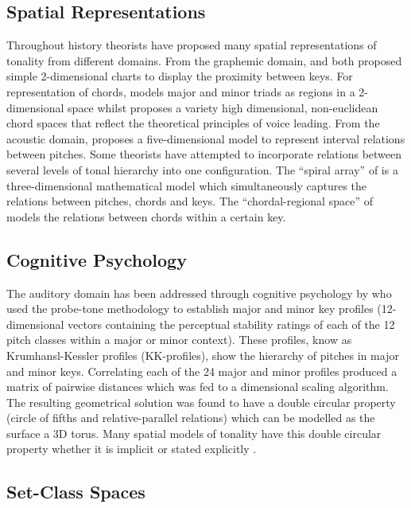 \documentclass{article}
\begin{document}
\subsection{Spatial Representations}
\label{sec-5-2}

Throughout history theorists have proposed many spatial
representations of tonality from different domains. From the graphemic
domain, \citet{Weber} and \citet{Schoenberg} both proposed simple
2-dimensional charts to display the proximity between keys. For
representation of chords, \citet{Riemann} models major and minor
triads as regions in a 2-dimensional space whilst \citet{Tymoczko2011}
proposes a variety high dimensional, non-euclidean chord spaces that
reflect the theoretical principles of voice leading. From the acoustic
domain, \citet{Shepard1982} proposes a five-dimensional model to
represent interval relations between pitches. Some theorists have
attempted to incorporate relations between several levels of tonal
hierarchy into one configuration. The ``spiral array'' of
\citet{Chew2000a} is a three-dimensional mathematical model which
simultaneously captures the relations between pitches, chords and
keys. The ``chordal-regional space'' of \citet{Lerdahl2001a} models the
relations between chords within a certain key.
\subsection{Cognitive Psychology}
\label{sec-5-3}

The auditory domain has been addressed through cognitive psychology by
\citet{Krumhansl1990} who used the probe-tone methodology
\citep{Krumhansl1979} to establish major and minor key profiles
(12-dimensional vectors containing the perceptual stability ratings of
each of the 12 pitch classes within a major or minor context). These
profiles, know as Krumhansl-Kessler profiles (KK-profiles), show the
hierarchy of pitches in major and minor keys. Correlating each of the
24 major and minor profiles produced a matrix of pairwise distances
which was fed to a dimensional scaling algorithm. The resulting
geometrical solution was found to have a double circular property
(circle of fifths and relative-parallel relations) which can be
modelled as the surface a 3D torus. Many spatial models of tonality
have this double circular property whether it is implicit
\citep{Weber,Schoenberg} or stated explicitly \citep{Lerdahl2001a}.
\subsection{Set-Class Spaces}
\label{sec-5-4}
\end{document}
